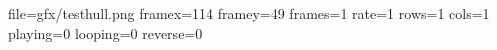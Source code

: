 file=gfx/testhull.png
framex=114
framey=49
frames=1
rate=1
rows=1
cols=1
playing=0
looping=0
reverse=0
